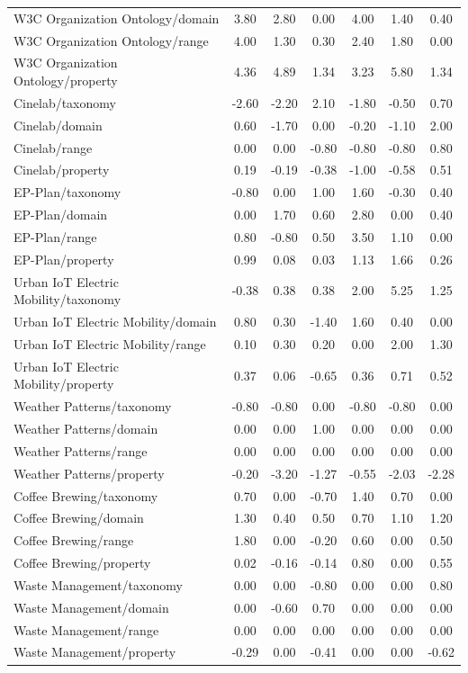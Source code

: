 \begin{tabular}{lcccccc}
W3C Organization Ontology/domain & 3.80 & 2.80 & 0.00 & 4.00 & 1.40 & 0.40 \\
W3C Organization Ontology/range & 4.00 & 1.30 & 0.30 & 2.40 & 1.80 & 0.00 \\
W3C Organization Ontology/property & 4.36 & 4.89 & 1.34 & 3.23 & 5.80 & 1.34 \\
Cinelab/taxonomy & -2.60 & -2.20 & 2.10 & -1.80 & -0.50 & 0.70 \\
Cinelab/domain & 0.60 & -1.70 & 0.00 & -0.20 & -1.10 & 2.00 \\
Cinelab/range & 0.00 & 0.00 & -0.80 & -0.80 & -0.80 & 0.80 \\
Cinelab/property & 0.19 & -0.19 & -0.38 & -1.00 & -0.58 & 0.51 \\
EP-Plan/taxonomy & -0.80 & 0.00 & 1.00 & 1.60 & -0.30 & 0.40 \\
EP-Plan/domain & 0.00 & 1.70 & 0.60 & 2.80 & 0.00 & 0.40 \\
EP-Plan/range & 0.80 & -0.80 & 0.50 & 3.50 & 1.10 & 0.00 \\
EP-Plan/property & 0.99 & 0.08 & 0.03 & 1.13 & 1.66 & 0.26 \\
Urban IoT Electric Mobility/taxonomy & -0.38 & 0.38 & 0.38 & 2.00 & 5.25 & 1.25 \\
Urban IoT Electric Mobility/domain & 0.80 & 0.30 & -1.40 & 1.60 & 0.40 & 0.00 \\
Urban IoT Electric Mobility/range & 0.10 & 0.30 & 0.20 & 0.00 & 2.00 & 1.30 \\
Urban IoT Electric Mobility/property & 0.37 & 0.06 & -0.65 & 0.36 & 0.71 & 0.52 \\
Weather Patterns/taxonomy & -0.80 & -0.80 & 0.00 & -0.80 & -0.80 & 0.00 \\
Weather Patterns/domain & 0.00 & 0.00 & 1.00 & 0.00 & 0.00 & 0.00 \\
Weather Patterns/range & 0.00 & 0.00 & 0.00 & 0.00 & 0.00 & 0.00 \\
Weather Patterns/property & -0.20 & -3.20 & -1.27 & -0.55 & -2.03 & -2.28 \\
Coffee Brewing/taxonomy & 0.70 & 0.00 & -0.70 & 1.40 & 0.70 & 0.00 \\
Coffee Brewing/domain & 1.30 & 0.40 & 0.50 & 0.70 & 1.10 & 1.20 \\
Coffee Brewing/range & 1.80 & 0.00 & -0.20 & 0.60 & 0.00 & 0.50 \\
Coffee Brewing/property & 0.02 & -0.16 & -0.14 & 0.80 & 0.00 & 0.55 \\
Waste Management/taxonomy & 0.00 & 0.00 & -0.80 & 0.00 & 0.00 & 0.80 \\
Waste Management/domain & 0.00 & -0.60 & 0.70 & 0.00 & 0.00 & 0.00 \\
Waste Management/range & 0.00 & 0.00 & 0.00 & 0.00 & 0.00 & 0.00 \\
Waste Management/property & -0.29 & 0.00 & -0.41 & 0.00 & 0.00 & -0.62 \\
\bottomrule
\end{tabular}
